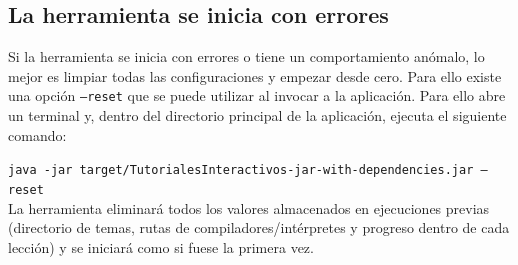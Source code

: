 \documentclass[]{article}
\begin{document}


\subsection{La herramienta se inicia con errores}
Si la herramienta se inicia con errores o tiene un comportamiento anómalo, lo mejor es limpiar todas las configuraciones y empezar desde cero. Para ello existe una opción \texttt{--reset} que se puede utilizar al invocar a la aplicación. Para ello abre un terminal y, dentro del directorio principal de la aplicación, ejecuta el siguiente comando:

{\small \texttt{java -jar target/TutorialesInteractivos-jar-with-dependencies.jar --reset}}\\

La herramienta eliminará todos los valores almacenados en ejecuciones previas (directorio de temas, rutas de compiladores/intérpretes y progreso dentro de cada lección) y se iniciará como si fuese la primera vez. 
\end{document}
